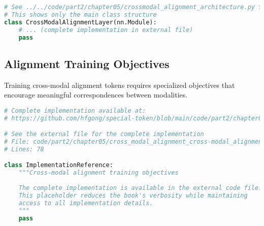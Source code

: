 \begin{lstlisting}[language=Python, caption=Core structure (see external file for complete implementation)]
# See ../../code/part2/chapter05/crossmodal_alignment_architecture.py for the complete implementation
# This shows only the main class structure
class CrossModalAlignmentLayer(nn.Module):
    # ... (complete implementation in external file)
    pass
\end{lstlisting}
\subsection{Alignment Training Objectives}

Training cross-modal alignment tokens requires specialized objectives that encourage meaningful correspondences between modalities.
\begin{comment}
Feedback: Before linking to the code, it's helpful to briefly explain the *goal* of these objectives in plain language. For example: "The primary goal of alignment objectives is to force the model to create a shared 'meaning space' where different modalities can be compared. The most common training objectives for this are:
1.  **Contrastive Loss**: Teaches the model to pull representations of corresponding inputs (e.g., a photo of a dog and the text 'a dog') together, while pushing non-corresponding inputs apart.
2.  **Matching Loss**: A binary classification task where the model is given a pair of inputs from different modalities and must predict whether they match or not.
3.  **Cross-Modal Generation**: Forcing the model to generate the representation of one modality from another (e.g., generating a text caption from an image)."
\end{comment}

\begin{lstlisting}[language=Python, caption={Cross-modal alignment training objectives}]
# Complete implementation available at:
# https://github.com/hfgong/special-token/blob/main/code/part2/chapter05/cross_modal_alignment_cross-modal_alignment_training.py

# See the external file for the complete implementation
# File: code/part2/chapter05/cross_modal_alignment_cross-modal_alignment_training.py
# Lines: 78

class ImplementationReference:
    """Cross-modal alignment training objectives
    
    The complete implementation is available in the external code file.
    This placeholder reduces the book's verbosity while maintaining
    access to all implementation details.
    """
    pass
\end{lstlisting}

